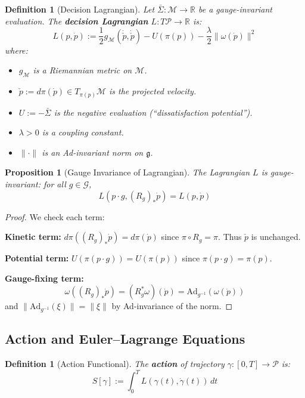 \documentclass[11pt]{article}
\newtheorem{proposition}[theorem]{Proposition}
\newtheorem{definition}[theorem]{Definition}
\begin{document}
\begin{definition}[Decision Lagrangian]
Let $\bar{\Sigma} : \mathcal{M} \to \mathbb{R}$ be a gauge-invariant evaluation. The
\textbf{decision Lagrangian} $L : T\mathcal{P} \to \mathbb{R}$ is:
\begin{equation}
L(p, \dot{p}) := \frac{1}{2} g_{\mathcal{M}}(\dot{\check{p}}, \dot{\check{p}}) - U(\pi(p)) - \frac{\lambda}{2} \|\omega(\dot{p})\|^2
\label{eq:lagrangian}
\end{equation}
where:
\begin{itemize}
    \item $g_{\mathcal{M}}$ is a Riemannian metric on $\mathcal{M}$.
    \item $\check{p} := d\pi(\dot{p}) \in T_{\pi(p)}\mathcal{M}$ is the projected velocity.
    \item $U := -\bar{\Sigma}$ is the negative evaluation (``dissatisfaction potential'').
    \item $\lambda > 0$ is a coupling constant.
    \item $\|\cdot\|$ is an Ad-invariant norm on $\mathfrak{g}$.
\end{itemize}
\end{definition}

\begin{proposition}[Gauge Invariance of Lagrangian]
The Lagrangian $L$ is gauge-invariant: for
all $g \in \mathcal{G}$,
\[
L(p \cdot g, (R_g)_* \dot{p}) = L(p, \dot{p})
\]
\end{proposition}

\begin{proof}
We check each term:

\textbf{Kinetic term:} $d\pi((R_g)_* \dot{p}) = d\pi(\dot{p})$ since $\pi \circ R_g = \pi$. Thus $\check{p}$ is unchanged.

\textbf{Potential term:} $U(\pi(p \cdot g)) = U(\pi(p))$ since $\pi(p \cdot g) = \pi(p)$.

\textbf{Gauge-fixing term:}
\[
\omega((R_g)_* \dot{p}) = (R_g^* \omega)(\dot{p}) = \mathrm{Ad}_{g^{-1}}(\omega(\dot{p}))
\]
and $\|\mathrm{Ad}_{g^{-1}}(\xi)\| = \|\xi\|$ by Ad-invariance of the norm.
\end{proof}

\subsection{Action and Euler--Lagrange Equations}

\begin{definition}[Action Functional]
The \textbf{action} of trajectory $\gamma : [0, T] \to \mathcal{P}$ is:
\[
S[\gamma] := \int_0^T L(\gamma(t), \dot{\gamma}(t)) \, dt
\]
\end{definition}
\end{document}
